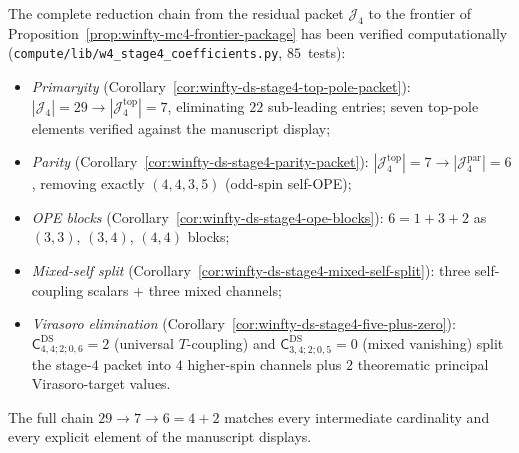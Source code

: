\begin{computation}
\label{comp:winfty-stage4-reduction-chain}
The complete reduction chain from the residual packet
$\mathcal{J}_4$ to the frontier of
Proposition~\ref{prop:winfty-mc4-frontier-package} has been
verified computationally
(\texttt{compute/lib/w4\_stage4\_coefficients.py}, $85$~tests):
\begin{itemize}
\item \emph{Primaryity}
  (Corollary~\ref{cor:winfty-ds-stage4-top-pole-packet}):
  $|\mathcal{J}_4| = 29 \to |\mathcal{J}_4^{\mathrm{top}}| = 7$,
  eliminating $22$ sub-leading entries; seven top-pole elements
  verified against the manuscript display;
\item \emph{Parity}
  (Corollary~\ref{cor:winfty-ds-stage4-parity-packet}):
  $|\mathcal{J}_4^{\mathrm{top}}| = 7
  \to |\mathcal{J}_4^{\mathrm{par}}| = 6$,
  removing exactly $(4,4,3,5)$ (odd-spin self-OPE);
\item \emph{OPE blocks}
  (Corollary~\ref{cor:winfty-ds-stage4-ope-blocks}):
  $6 = 1 + 3 + 2$ as $(3,3)$, $(3,4)$, $(4,4)$ blocks;
\item \emph{Mixed-self split}
  (Corollary~\ref{cor:winfty-ds-stage4-mixed-self-split}):
  three self-coupling scalars $+$ three mixed channels;
\item \emph{Virasoro elimination}
  (Corollary~\ref{cor:winfty-ds-stage4-five-plus-zero}):
  $\mathsf{C}^{\mathrm{DS}}_{4,4;2;0,6} = 2$ (universal $T$-coupling)
  and $\mathsf{C}^{\mathrm{DS}}_{3,4;2;0,5} = 0$ (mixed vanishing)
  split the stage-$4$ packet into $4$ higher-spin channels plus
  $2$ theorematic principal Virasoro-target values.
\end{itemize}
The full chain $29 \to 7 \to 6 = 4 + 2$ matches every intermediate
cardinality and every explicit element of the manuscript displays.
\end{computation}

